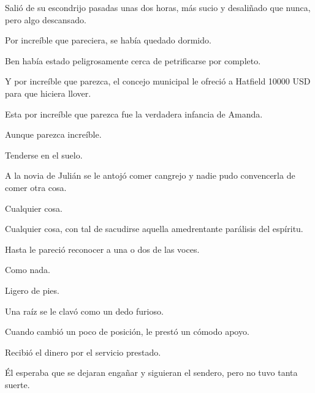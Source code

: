 \sk
Salió de su escondrijo pasadas unas dos horas,
más sucio y desaliñado que nunca, pero algo
descansado.

\sk
 Por increíble que pareciera, se había
quedado dormido.

\sk
Ben había estado peligrosamente cerca de
petrificarse por completo.

\sk
Y por increíble que parezca, el concejo municipal le ofreció a Hatfield 10000 USD para que hiciera llover.

\sk
Esta por increíble que parezca fue la verdadera infancia de Amanda.

\sk
Aunque parezca increíble. 

\sk
Tenderse en el suelo. 

\sk
A la novia de Julián se le antojó comer cangrejo y nadie pudo convencerla de comer otra cosa.

\sk
Cualquier cosa. 

\sk
Cualquier cosa,
con tal de sacudirse aquella amedrentante parálisis
del espíritu.

\sk
Hasta le pareció reconocer a una o dos de las voces.

\sk
Como nada. 

\sk
Ligero de pies. 

\sk
Una raíz se le clavó como un dedo furioso.

\sk
Cuando cambió un poco de posición, le prestó un cómodo apoyo.

\sk
Recibió el dinero por el servicio prestado.

\sk
Él esperaba que se dejaran engañar y siguieran el sendero,
pero no tuvo tanta suerte.

